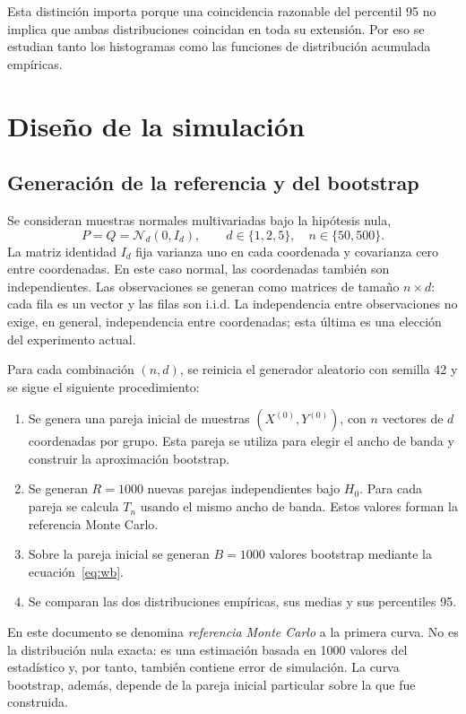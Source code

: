 \documentclass[11pt,a4paper]{article}
\begin{document}
Esta distinción importa porque una coincidencia razonable del percentil 95 no implica que ambas distribuciones coincidan en toda su extensión. Por eso se estudian tanto los histogramas como las funciones de distribución acumulada empíricas.

\section{Diseño de la simulación}
\subsection{Generación de la referencia y del bootstrap}
Se consideran muestras normales multivariadas bajo la hipótesis nula,
\[
P=Q=\mathcal N_d(0,I_d),\qquad
d\in\{1,2,5\},\quad n\in\{50,500\}.
\]
La matriz identidad $I_d$ fija varianza uno en cada coordenada y covarianza cero entre coordenadas. En este caso normal, las coordenadas también son independientes. Las observaciones se generan como matrices de tamaño $n\times d$: cada fila es un vector y las filas son i.i.d. La independencia entre observaciones no exige, en general, independencia entre coordenadas; esta última es una elección del experimento actual.

Para cada combinación $(n,d)$, se reinicia el generador aleatorio con semilla 42 y se sigue el siguiente procedimiento:
\begin{enumerate}
\item Se genera una pareja inicial de muestras $(X^{(0)},Y^{(0)})$, con $n$ vectores de $d$ coordenadas por grupo. Esta pareja se utiliza para elegir el ancho de banda y construir la aproximación bootstrap.
\item Se generan $R=1000$ nuevas parejas independientes bajo $H_0$. Para cada pareja se calcula $T_n$ usando el mismo ancho de banda. Estos valores forman la referencia Monte Carlo.
\item Sobre la pareja inicial se generan $B=1000$ valores bootstrap mediante la ecuación~\eqref{eq:wb}.
\item Se comparan las dos distribuciones empíricas, sus medias y sus percentiles 95.
\end{enumerate}
En este documento se denomina \emph{referencia Monte Carlo} a la primera curva. No es la distribución nula exacta: es una estimación basada en 1000 valores del estadístico y, por tanto, también contiene error de simulación. La curva bootstrap, además, depende de la pareja inicial particular sobre la que fue construida.
\end{document}

